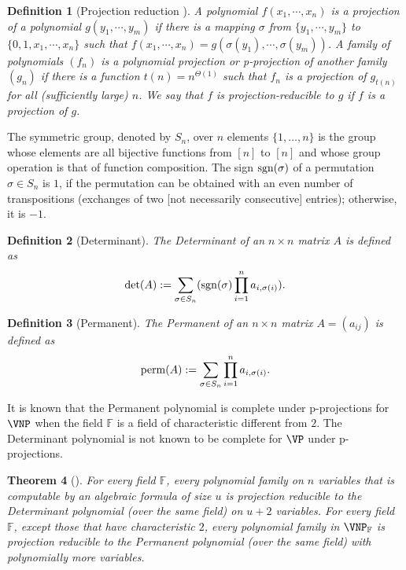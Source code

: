 \documentclass[11pt,letter]{article}
\newtheorem{theorem}{Theorem}[section]
\newtheorem{definition}[theorem]{Definition}
\theoremstyle{remark} %
\newcommand{\sgn}{{\rm sgn}}
\newcommand{\perm}{{\rm perm}}
\begin{document}
{    \begin{definition}[Projection reduction \cite{Val79:ComplClass}]
         A polynomial $f(x_1,\cdots, x_n)$ is a \emph{projection} of a polynomial $g(y_1,\cdots, y_m)$ if there is a mapping $\sigma$ from $\{y_1,\cdots,y_m\}$ to $
         \{0,1, x_1, \cdots, x_n\}$ such that $f(x_1,\cdots,x_n) = g(\sigma(y_1),\cdots,\sigma(y_m))$.
        A family of polynomials $(f_n)$ is a \emph{polynomial projection} or \emph{p-projection} of another family $(g_n)$ if there is a function $t(n)=n^{\Theta(1)}$ such that $f_n$ is a projection of $g_{t(n)}$ for all (sufficiently large) $n$.
        We say that $f$ is projection-reducible to $g$ if $f$ is a projection of $g$.
    \end{definition}


    The symmetric group, denoted by $S_n$, over $n$ elements $\{1,\dots,n\}$ is the group whose elements are all bijective functions from $[n]$ to $[n]$ and whose group operation is that of function composition. The sign $\sgn(\sigma)$ of a permutation $\sigma\in S_n$ is $1$, if the permutation can be obtained with an even number of transpositions (exchanges of two [not necessarily consecutive] entries); otherwise, it is $-1$. 

 
    \begin{definition}[Determinant]
        The \emph{Determinant} of an $n\times n$ matrix $A$ is defined as
        \[
            \det(A) := \sum_{\sigma \in S_n} (\sgn(\sigma) \prod_{i=1}^n a_{i,\sigma(i)}).
        \]
    \end{definition}
    \begin{definition}[Permanent] 
        The \emph{Permanent} of an $n \times n$ matrix $A = (a_{ij})$ is defined as
        \[
            \perm(A) := \sum_{\sigma \in S_n} \prod_{i=1}^n a_{i,\sigma(i)}.
        \]
    \end{definition}

    It is known that the Permanent polynomial is complete under p-projections for $\VNP$ when the field $\mathbb{F}$ is a field of characteristic different from $2$. The Determinant polynomial is not known to be complete for $\VP$ under p-projections.
    
    \begin{theorem}[\cite{Val79:ComplClass}]
        For every field $\mathbb{F}$, every polynomial family on $n$ variables that is computable by an algebraic formula of size $u$ is projection reducible to the Determinant polynomial (over the same field) on $u+2$ variables.
        For every field $\mathbb{F}$, except those that have characteristic $2$, every polynomial family in $\VNP_\mathbb{F}$ is projection reducible to the Permanent polynomial (over the same field) with polynomially more variables.
    \end{theorem}
    
}
\end{document}
